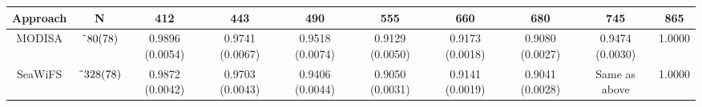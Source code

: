 \documentclass[preview]{standalone}
\begin{document}
\begin{threeparttable}

\centering
\begin{tabular}{cccccccccc} 
 \hline 
Approach & N\tnote{\it a}			  & 412 	 			& 443 	  			& 490    			& 555    			& 660    						& 680    						& 745    			& 865    \\ \hline
MODISA\tnote{\it b}& $\char`\~80(78)$ & 0.9896 (0.0054) 	& 0.9741 (0.0067) & 0.9518 (0.0074) & 0.9129 (0.0050) & 0.9173 (0.0018) 			& 0.9080 (0.0027) &  0.9474 (0.0030) 	& 1.0000 \\%
SeaWiFS\tnote{\it b}& $\char`\~328(78)$ &0.9872 (0.0042) & 0.9703 (0.0043) & 0.9406 (0.0044) & 0.9050 (0.0031) & 0.9141 (0.0019)\tnote{\it c} & 0.9041 (0.0028)\tnote{\it c} & Same as above   & 1.0000 \\%

\end{tabular}
\end{threeparttable}
\end{document}
